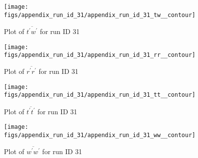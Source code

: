 \begin{figure}[H]
\centering
\texttt{[image: figs/appendix\_run\_id\_31/appendix\_run\_id\_31\_tw\_\_contour]}
\caption{Plot of $\overline{t^\prime w^\prime}$ for run ID 31}
\label{fig:appendix_run_id_31_tw__contour}
\end{figure}


\begin{figure}[H]
\centering
\texttt{[image: figs/appendix\_run\_id\_31/appendix\_run\_id\_31\_rr\_\_contour]}
\caption{Plot of $\overline{r^\prime r^\prime}$ for run ID 31}
\label{fig:appendix_run_id_31_rr__contour}
\end{figure}


\begin{figure}[H]
\centering
\texttt{[image: figs/appendix\_run\_id\_31/appendix\_run\_id\_31\_tt\_\_contour]}
\caption{Plot of $\overline{t^\prime t^\prime}$ for run ID 31}
\label{fig:appendix_run_id_31_tt__contour}
\end{figure}


\begin{figure}[H]
\centering
\texttt{[image: figs/appendix\_run\_id\_31/appendix\_run\_id\_31\_ww\_\_contour]}
\caption{Plot of $\overline{w^\prime w^\prime}$ for run ID 31}
\label{fig:appendix_run_id_31_ww__contour}
\end{figure}


